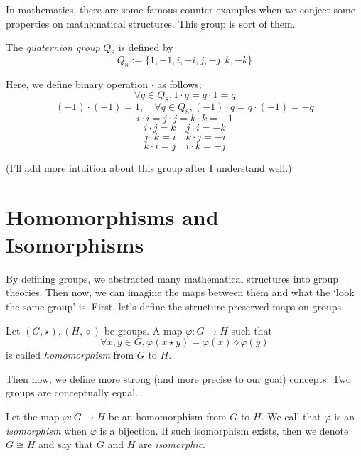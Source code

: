 \documentclass[12pt, a4paper, openany, twoside]{book}
\theoremstyle{definition}
\theoremstyle{remark}
\theoremstyle{plain}
\numberwithin{equation}{section}
\begin{document}
In mathematics, there are some famous counter-examples when we conject some properties on mathematical structures.
This group is sort of them. 

\begin{tcolorbox}[colback=yellow!10!white,colframe=brown!75!black,title=Quaternion Group]

The \textit{quaternion group} $Q_8$ is defined by 
\[Q_8 := \{1, -1, i, -i, j, -j, k, -k\}\]

Here, we define binary operation $\cdot$ as follows; 
\[\forall q \in Q_8, 1 \cdot q = q \cdot 1 = q\]
\[(-1) \cdot (-1) = 1, \quad \forall q \in Q_8, (-1) \cdot q = q \cdot (-1) = -q\]
\[i \cdot i = j \cdot j = k \cdot k = -1\]
\[i \cdot j = k \quad j \cdot i = -k \]
\[j \cdot k = i \quad k \cdot j = -i \]
\[k \cdot i = j \quad i \cdot k = -j\]

\end{tcolorbox}

(I'll add more intuition about this group after I understand well.)

\newpage 

\section{Homomorphisms and Isomorphisms}

By defining groups, we abstracted many mathematical structures into group theories. 
Then now, we can imagine the maps between them and what the \lq look the same group' is.
First, let's define the structure-preserved maps on groups. 

\begin{tcolorbox}[colback=yellow!10!white,colframe=brown!75!black,title=Homomorphism]

Let $(G, \star), (H, \diamond)$ be groups. A map $\varphi : G \rightarrow H$ such that 
\[\forall x, y \in G, \varphi(x \star y) = \varphi(x) \diamond \varphi(y)\]
is called \textit{homomorphism} from $G$ to $H$. 

\end{tcolorbox}

Then now, we define more strong (and more precise to our goal) concepts: Two groups are conceptually equal. 

\begin{tcolorbox}[colback=yellow!10!white,colframe=brown!75!black,title=Isomorphism]

Let the map $\varphi : G \rightarrow H$ be an homomorphism from $G$ to $H$. We call that $\varphi$ is an \textit{isomorphism} when $\varphi$ is a bijection. 
If such isomorphism exists, then we denote $G \cong H$ and say that $G$ and $H$ are \textit{isomorphic}.  

\end{tcolorbox}
\end{document}
